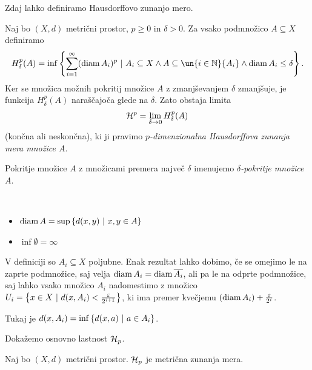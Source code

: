Zdaj lahko definiramo Hausdorffovo zunanjo mero.
\begin{definicija}
    \label{def-haus-mera}
    Naj bo \((X, d)\) metrični prostor, \(p \geq 0\) in \(\delta > 0\). Za vsako podmnožico \(A \subseteq X\) definiramo 
    \[H^p_\delta(A) = \inf \setb{\sum_{i=1}^{\infty}(\diam A_i)^p}{A_i \subseteq X \land A \subseteq \un{i \in \N}{A_i} \land \diam A_i \leq \delta}.\]
    Ker se množica možnih pokritij množice \(A\) z zmanjševanjem \(\delta\) zmanjšuje, je funkcija \(H^p_\delta(A)\) naraščajoča glede na \(\delta\). Zato obstaja limita
    \[\mathcal{H}^p = \lim_{\delta \to 0} H_\delta^p(A)\]
    (končna ali neskončna), ki ji pravimo \emph{\(p\)-dimenzionalna Hausdorffova zunanja mera množice \(A\)}.

    Pokritje množice \(A\) z množicami premera največ \(\delta\) imenujemo \emph{\(\delta\)-pokritje množice \(A\)}.
\end{definicija}

\begin{opomba} \ 
    \begin{itemize}
        \item \(\operatorname{diam} A = \sup \left\{d(x, y) \ | \ x, y \in A\right\}\)
        \item \(\inf \emptyset = \infty\)
    \end{itemize}
\end{opomba}

\begin{opomba}
    \label{odp-zap-haus}
    V definiciji so \(A_i \subseteq X\) poljubne. Enak rezultat lahko dobimo, če se omejimo le na zaprte podmnožice, saj velja \(\operatorname{diam} A_i = \operatorname{diam} \overline{A_i}\), ali pa le na odprte podmnožice, saj lahko vsako množico \(A_i\) nadomestimo z množico \(U_i = \left\{x \in X \ | \ d(x, A_i) < \frac{\varepsilon}{2^{i+1}}\right\}\), ki ima premer kvečjemu \((\operatorname{diam} A_i) + \frac{\varepsilon}{2^i}\).

    Tukaj je \(d(x, A_i) = \inf \left\{d(x, a) \ | \ a \in A_i\right\}\).
\end{opomba}

Dokažemo osnovno lastnost \(\mathcal{H}_p\).
\begin{trditev}
    \label{haus-m-zun}
    Naj bo \((X, d)\) metrični prostor. \(\mathcal{H}_p\) je metrična zunanja mera.
\end{trditev}


